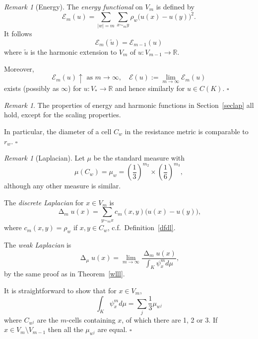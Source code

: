 \documentclass[a4paper]{amsart}
\theoremstyle{plain}
\theoremstyle{definition}
\theoremstyle{remark}
\newtheorem{remark}[theorem]{Remark}
\DeclareMathOperator{\lap}{\Delta}
\begin{document}
\begin{remark}[Energy]  The \emph{energy functional} on $ V_m $ is defined by
\[
\mathcal{E} _m (u) = \sum_{|w|=m} \sum_{x\sim_m y} \rho_w \big( u(x) - u(y) \big)^2 .
\]
It follows 
\begin{equation} \label{} 
\mathcal{E} _m (\widetilde{u})  = \mathcal{E} _{m-1}(u) 
\end{equation} 
where $ \widetilde{u} $ is the harmonic extension to $ V_m $ of $ u :V_{m-1} \to \mathbb{R} $.

Moreover,
\begin{equation} \label{}
\mathcal{E} _m(u) \uparrow \text{ as } m \to \infty , \quad \mathcal{E} (u) := \lim_{m\to \infty } \mathcal{E} _m (u) 
\end{equation}
exists (possibly as $ \infty $) for $u :V_* \to \mathbb{R} $ and  hence similarly for $ u \in C(K) $.
\hfill $\square$  

\end{remark}


\begin{remark} The properties of energy and harmonic functions in Section~\ref{seclap} all hold, except for the scaling properties.

In particular, the diameter of a cell $ C_w $ in the resistance metric is comparable to $ r _w $.
\hfill $\square$ 
 \end{remark}


\begin{remark}[Laplacian]  Let $ \mu $ be the standard measure with 
\[
 \mu(C_w) = \mu_w  = \left(  \frac{1}{3} \right)^{m_2} \times \left( \frac{1 }{6} \right)^{m_3} ,
 \]
 although any other measure is similar.  
 
 The \emph{discrete Laplacian} for $ x \in V_m $ is 
 \[
 \lap_m u(x) = \sum_{y\sim_m x} c_m(x,y) \big( u(x) - u(y) \big),
 \]
where $ c_m(x,y) = \rho_w $ if $ x,y \in C_w $,  c.f.\  Definition~\ref{dfdl}.

 The \emph{weak Laplacian} is
 \[ 
 \lap_\mu u(x) = \lim_{m\to \infty}  \frac{\lap_m u(x)} { \int_K \psi_x^m d\mu},
\]
by the same proof as in  Theorem~\ref{wlll}.
 
 It is straightforward to show that for $ x \in V_m $,
 \[
 \int_K \psi_x^m d\mu = \sum_j \frac{1}{3} \mu_{w^j} 
  \] 
 where $ C_{w^j} $  are the $ m $-cells containing $ x $,  of which there are 1, 2 or 3.  If $ x \in V_m \setminus V_{m-1} $ then all the $ \mu_{w^j} $ are equal.
 \hfill $\square$  \end{remark}
\end{document}
